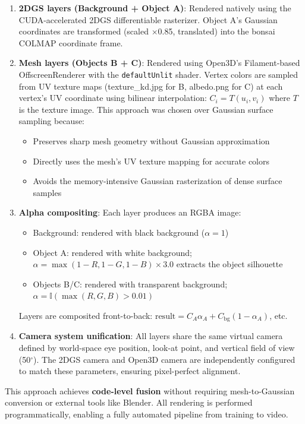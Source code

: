 \documentclass{article}
\begin{document}
\begin{enumerate}[leftmargin=*]
    \item \textbf{2DGS layers (Background + Object A)}: Rendered natively using
    the CUDA-accelerated 2DGS differentiable rasterizer. Object A's Gaussian
    coordinates are transformed (scaled $\times$0.85, translated) into the bonsai
    COLMAP coordinate frame.
    \item \textbf{Mesh layers (Objects B + C)}: Rendered using Open3D's
    Filament-based OffscreenRenderer with the \texttt{defaultUnlit} shader.
    Vertex colors are sampled from UV texture maps (texture\_kd.jpg for B,
    albedo.png for C) at each vertex's UV coordinate using bilinear
    interpolation: $C_i = T(u_i, v_i)$ where $T$ is the texture image.
    This approach was chosen over Gaussian surface sampling because:
    \begin{itemize}
        \item Preserves sharp mesh geometry without Gaussian approximation
        \item Directly uses the mesh's UV texture mapping for accurate colors
        \item Avoids the memory-intensive Gaussian rasterization of dense
        surface samples
    \end{itemize}
    \item \textbf{Alpha compositing}: Each layer produces an RGBA image:
    \begin{itemize}
        \item Background: rendered with black background ($\alpha=1$)
        \item Object A: rendered with white background; $\alpha = \max(1-R, 1-G, 1-B) \times 3.0$ extracts the object silhouette
        \item Objects B/C: rendered with transparent background; $\alpha = \mathbb{I}(\max(R,G,B) > 0.01)$
    \end{itemize}
    Layers are composited front-to-back: $\text{result} = C_A\alpha_A + C_{\text{bg}}(1-\alpha_A)$, etc.
    \item \textbf{Camera system unification}: All layers share the same virtual
    camera defined by world-space eye position, look-at point, and vertical field
    of view (50$^\circ$). The 2DGS camera and Open3D camera are independently
    configured to match these parameters, ensuring pixel-perfect alignment.
\end{enumerate}

This approach achieves \textbf{code-level fusion} without requiring mesh-to-Gaussian
conversion or external tools like Blender. All rendering is performed
programmatically, enabling a fully automated pipeline from training to video.
\end{document}
